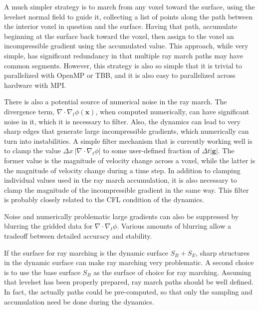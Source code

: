 \documentclass{article}
\def\xvec{\textbf{x}}
\def\gvec{\textbf{g}}
\def\dt{\Delta t}
\def\dx{\Delta x}
\def\dx{\Delta x}
\begin{document}
A much simpler strategy is to march from any voxel toward the surface, using the levelset normal field to guide it, collecting a list of points along the path between the interior voxel in question and the surface.  Having that path, accumulate beginning at the surface back toward the voxel, then assign to the voxel an incompressible gradient using the accumulated value.  This approach, while very simple, has significant redundancy in that multiple ray march paths may have common segments.  However, this strategy is also so simple that it is trivial to parallelized with OpenMP or TBB, and it is also easy to parallelized across hardware with MPI. 

There is also a potential source of numerical noise in the ray march.  The divergence term, $\nabla\cdot\nabla_t\phi(\xvec)$, when computed numerically, can have significant noise in it, which it is necessary to filter.  Also, the dynamics can lead to very sharp edges that generate large incompressible gradients, which numerically can turn into instabilities. A simple filter mechanism that is currently working well is to clamp the value $\dx\ |  \nabla\cdot\nabla_t\phi |$ to some user-defined fraction of $\dt| \gvec |$.  The former value is the magnitude of velocity change across a voxel, while the latter is the magnitude of velocity change during a time step.  In addition to clamping individual values used in the ray march accumulation, it is also necessary to clamp the magnitude of the incompressible gradient in the same way.  This filter is probably closely related to the CFL condition of the dynamics.

Noise and numerically problematic large gradients can also be suppressed by blurring the gridded data for $\nabla\cdot\nabla_t\phi$.  Various amounts of blurring allow a tradeoff between detailed accuracy and stability.

If the surface for ray marching is the dynamic surface $S_B+S_E$, sharp structures in the dynamic surface can make ray marching very problematic.  A second choice is to use the base surface $S_B$ as the surface of choice for ray marching. Assuming that levelset has been properly prepared, ray march paths should be well defined.  In fact, the actually paths could be pre-computed, so that only the sampling and accumulation need be done during the dynamics. 
\end{document}
